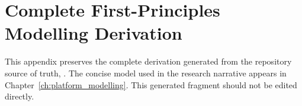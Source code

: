 \chapter{Complete First-Principles Modelling Derivation}
\label{app:full_derivation}

This appendix preserves the complete derivation generated from the repository
source of truth, . The concise model used in the research
narrative appears in Chapter~\ref{ch:platform_modelling}. This generated
fragment should not be edited directly.

